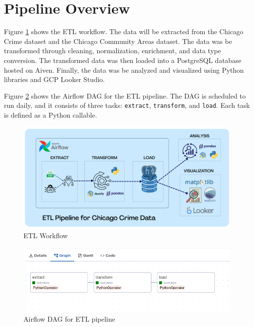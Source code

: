 \documentclass[12pt]{article}
\begin{document}
\section{Pipeline Overview}

Figure \ref{fig:workflow} shows the ETL workflow. The data will be extracted from the Chicago Crime dataset and the Chicago Community Areas dataset. The data was be transformed through cleaning, normalization, enrichment, and data type conversion. The transformed data was then loaded into a PostgreSQL database hosted on Aiven. Finally, the data was be analyzed and visualized using Python libraries and GCP Looker Studio.

Figure \ref{fig:airflow_etl} shows the Airflow DAG for the ETL pipeline. The DAG is scheduled to run daily, and it consists of three tasks: \texttt{extract}, \texttt{transform}, and \texttt{load}. Each task is defined as a Python callable.
\begin{figure}[h!]
    \centering
    \includegraphics[width=1\textwidth]{figures/workflow.png}
    \caption{ETL Workflow}
    \label{fig:workflow}
\end{figure}

\begin{figure}[h!]
    \centering
    \includegraphics[width=1\textwidth]{figures/airflow_etl.png}
    \caption{Airflow DAG for ETL pipeline}
    \label{fig:airflow_etl}
\end{figure}
\end{document}
